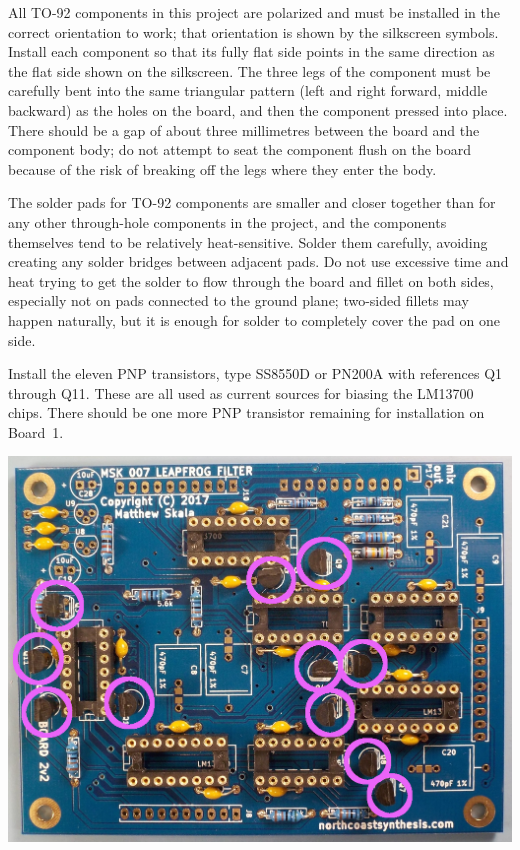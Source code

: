 All TO-92 components in this project are polarized and must be installed in
the correct orientation to work; that orientation is shown by the silkscreen
symbols.  Install each component so that its fully flat side points in the same
direction as the flat side shown on the silkscreen.  The three legs of the
component must be carefully bent into the same triangular pattern (left and
right forward, middle backward) as the holes on the board, and then the
component pressed into place.  There should be a gap of about three
millimetres between the board and the component body; do not attempt to seat
the component flush on the board because of the risk of breaking off the
legs where they enter the body.

The solder pads for TO-92 components are smaller and closer together than
for any other through-hole components in the project, and the components
themselves tend to be relatively heat-sensitive.  Solder them carefully,
avoiding creating any solder bridges between adjacent pads.  Do not use
excessive time and heat trying to get the solder to flow through the board
and fillet on both sides, especially not on pads connected to the ground
plane; two-sided fillets may happen naturally, but it is enough for solder
to completely cover the pad on one side.

\pagebreak

Install the eleven PNP transistors, type SS8550D or PN200A with references
Q1 through Q11.  These are all used as current sources for biasing the
LM13700 chips.  There should be one more PNP transistor remaining for
installation on Board~1.

\nopagebreak
\noindent\includegraphics[width=\linewidth]{pn200a-2.jpg}

